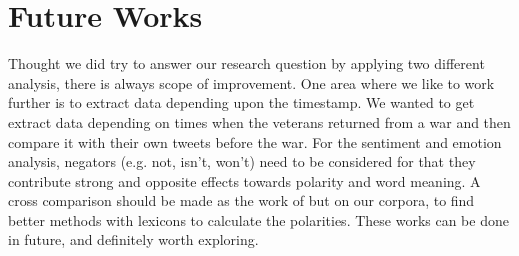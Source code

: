 \section{Future Works}

Thought we did try to answer our research question by applying two different analysis, there is always scope of improvement. One area where we like to work further is to extract data depending upon the timestamp. We wanted to get extract data depending on times when the veterans returned from a war and then compare it with their own tweets before the war. For the sentiment and emotion analysis, negators (e.g. not, isn't, won't) need to be considered for that they contribute strong and opposite effects towards polarity and word meaning. A cross comparison should be made as the work of \cite{emoIntenT} but on our corpora, to find better methods with lexicons to calculate the polarities. These works can be done in future, and definitely worth exploring.
